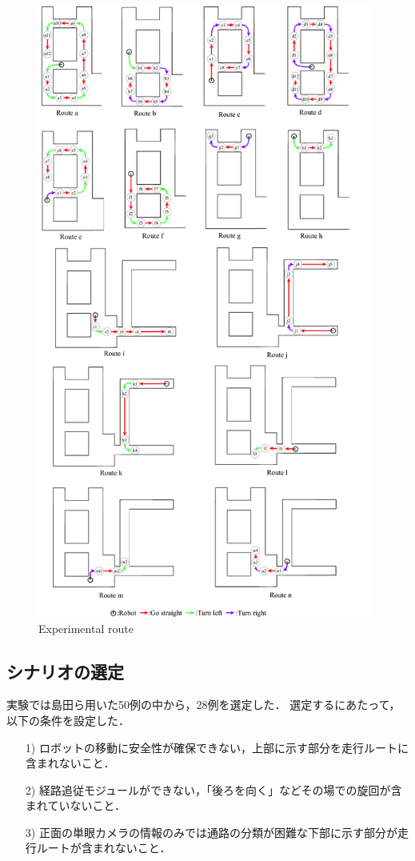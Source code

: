 \begin{figure}
  \centering
  \includegraphics[width=110mm]{images/pdf/ishiguro/route.pdf}
  \caption{Experimental route}
  \label{fig:route}
\end{figure}

\newpage
\subsection{シナリオの選定}
実験では島田ら用いた50例の中から，28例を選定した．
選定するにあたって，以下の条件を設定した．

\begin{enumerate}
  \item [1)] ロボットの移動に安全性が確保できない，上部に示す部分を走行ルートに含まれないこと．
  \item [2)] 経路追従モジュールができない，「後ろを向く」などその場での旋回が含まれていないこと．
  \item [3)] 正面の単眼カメラの情報のみでは通路の分類が困難な下部に示す部分が走行ルートが含まれないこと．
\end{enumerate}
 
